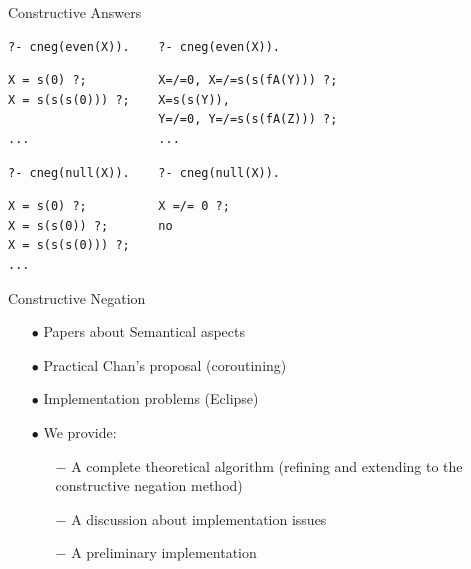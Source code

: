 \documentclass[pdf,slideColor,contemporain]{prosper}
\begin{document}
\begin{slide}{Constructive Answers}
\vspace{-0.5cm}
\begin{small}
\hspace{-0.8cm}
\begin{verbatim}
?- cneg(even(X)).    ?- cneg(even(X)).
\end{verbatim}
{\blue \begin{verbatim}
X = s(0) ?;          X=/=0, X=/=s(s(fA(Y))) ?;
X = s(s(s(0))) ?;    X=s(s(Y)), 
                     Y=/=0, Y=/=s(s(fA(Z))) ?;
...                  ...

\end{verbatim}}


\begin{verbatim}
?- cneg(null(X)).    ?- cneg(null(X)).
\end{verbatim}
{\blue \begin{verbatim}
X = s(0) ?;          X =/= 0 ?;
X = s(s(0)) ?;       no
X = s(s(s(0))) ?;      
...                
\end{verbatim} }
\end{small}
\end{slide}

\begin{slide}{Constructive Negation}
     \begin{itemize}
        \item[{\blue $\bullet$}] Papers about {\blue Semantical}
        aspects

        \item[{\blue $\bullet$}] Practical {\blue Chan}'s proposal
        (coroutining)

        \item[{\blue $\bullet$}] Implementation {\blue problems}
        (Eclipse)

        \item[{\blue $\bullet$}] We provide:
              \begin{itemize}

                \item[{\blue $-$}] A complete theoretical {\blue
                algorithm} (refining and extending to the constructive
                negation method)

                \item[{\blue $-$}] A discussion about {\blue
                implementation} issues

                \item[{\blue $-$}] A preliminary implementation
              \end{itemize}
     \end{itemize}

\end{slide}
\end{document}
